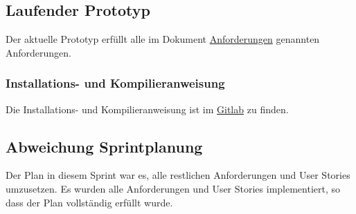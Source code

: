 \documentclass[a4paper,11pt]{article}
\begin{document}
\subsection{Laufender Prototyp}
Der aktuelle Prototyp erfüllt alle im Dokument \href{https://git.informatik.uni-rostock.de/softwaretechnik-ws-2025-26/uebung3/team3/projekt-team3-uebung3/-/blob/main/anforderungen/anforderungen.pdf?ref_type=heads}{Anforderungen} genannten Anforderungen.

\subsubsection*{Installations- und Kompilieranweisung}
Die Installations- und Kompilieranweisung ist im \href{https://git.informatik.uni-rostock.de/softwaretechnik-ws-2025-26/uebung3/team3/projekt-team3-uebung3/-/blob/main/README.md?ref_type=heads}{Gitlab} zu finden.


\subsection{Abweichung Sprintplanung}
Der Plan in diesem Sprint war es, alle restlichen Anforderungen und User Stories umzusetzen.
Es wurden alle Anforderungen und User Stories implementiert, so dass der Plan vollständig erfüllt wurde.
\end{document}

